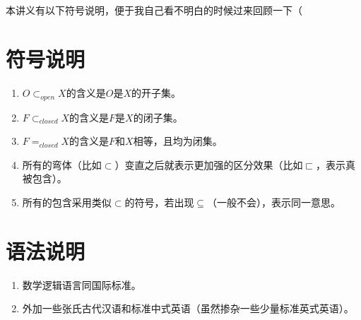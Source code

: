 \documentclass[lang=cn,10pt,device=pad]{elegantbook}
\begin{document}
本讲义有以下符号说明，便于我自己看不明白的时候过来回顾一下（
\section{符号说明}
\begin{enumerate}
	\item $O\subset_{open}X$的含义是$O$是$X$的开子集。
	\item $F\subset_{closed}X$的含义是$F$是$X$的闭子集。
	\item $F=_{closed}X$的含义是$F$和$X$相等，且均为闭集。
	\item 所有的弯体（比如$\subset$）变直之后就表示更加强的区分效果（比如$\sqsubset$，表示真被包含）。
	\item 所有的包含采用类似$\subset$的符号，若出现$\subseteq$（一般不会），表示同一意思。
\end{enumerate}
\section{语法说明}
\begin{enumerate}
	\item 数学逻辑语言同国际标准。
	\item 外加一些张氏古代汉语和标准中式英语（虽然掺杂一些少量标准英式英语）。
\end{enumerate}

\printindex
\end{document}
